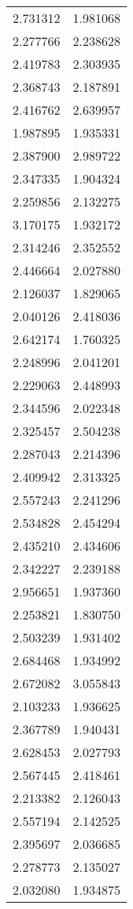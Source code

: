 \begin{longtable}[c]{ll}
    2.731312 & 1.981068 \\
    2.277766 & 2.238628 \\
    2.419783 & 2.303935 \\
    2.368743 & 2.187891 \\
    2.416762 & 2.639957 \\
    1.987895 & 1.935331 \\
    2.387900 & 2.989722 \\
    2.347335 & 1.904324 \\
    2.259856 & 2.132275 \\
    3.170175 & 1.932172 \\
    2.314246 & 2.352552 \\
    2.446664 & 2.027880 \\
    2.126037 & 1.829065 \\
    2.040126 & 2.418036 \\
    2.642174 & 1.760325 \\
    2.248996 & 2.041201 \\
    2.229063 & 2.448993 \\
    2.344596 & 2.022348 \\
    2.325457 & 2.504238 \\
    2.287043 & 2.214396 \\
    2.409942 & 2.313325 \\
    2.557243 & 2.241296 \\
    2.534828 & 2.454294 \\
    2.435210 & 2.434606 \\
    2.342227 & 2.239188 \\
    2.956651 & 1.937360 \\
    2.253821 & 1.830750 \\
    2.503239 & 1.931402 \\
    2.684468 & 1.934992 \\
    2.672082 & 3.055843 \\
    2.103233 & 1.936625 \\
    2.367789 & 1.940431 \\
    2.628453 & 2.027793 \\
    2.567445 & 2.418461 \\
    2.213382 & 2.126043 \\
    2.557194 & 2.142525 \\
    2.395697 & 2.036685 \\
    2.278773 & 2.135027 \\
    2.032080 & 1.934875 \\

\end{longtable}
